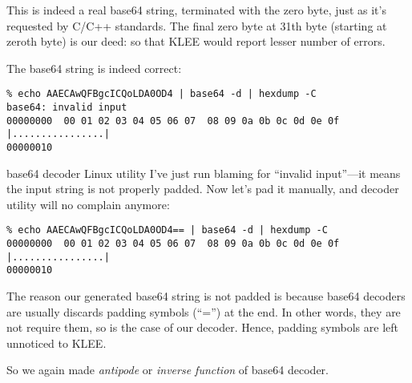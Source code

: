 This is indeed a real base64 string, terminated with the zero byte, just as it's requested by C/C++ standards.
The final zero byte at 31th byte (starting at zeroth byte) is our deed: so that KLEE would report lesser number of errors. %

The base64 string is indeed correct:

\begin{lstlisting}
% echo AAECAwQFBgcICQoLDA0OD4 | base64 -d | hexdump -C
base64: invalid input
00000000  00 01 02 03 04 05 06 07  08 09 0a 0b 0c 0d 0e 0f  |................|
00000010
\end{lstlisting}

base64 decoder Linux utility I've just run blaming for ``invalid input''---it means the input string is not properly padded.
Now let's pad it manually, and decoder utility will no complain anymore:

\begin{lstlisting}
% echo AAECAwQFBgcICQoLDA0OD4== | base64 -d | hexdump -C
00000000  00 01 02 03 04 05 06 07  08 09 0a 0b 0c 0d 0e 0f  |................|
00000010
\end{lstlisting}

The reason our generated base64 string is not padded is because base64 decoders are usually discards padding symbols (``='') at the end.
In other words, they are not require them, so is the case of our decoder.
Hence, padding symbols are left unnoticed to KLEE.

So we again made \textit{antipode} or \textit{inverse function} of base64 decoder.

